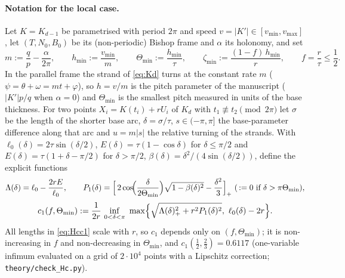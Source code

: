 
\paragraph{Notation for the local case.} Let $K=K_{d-1}$ be parametrised with period $2\pi$ and speed
$v=|K'|\in[v_{\min},v_{\max}]$, let $(T,N_0,B_0)$ be its (non-periodic) Bishop frame and $\alpha$ its holonomy,
and set
\[
m:=\frac qp-\frac{\alpha}{2\pi},\qquad h_{\min}:=\frac{v_{\min}}{m},\qquad
\Theta_{\min}:=\frac{h_{\min}}{\tau},\qquad \zeta_{\min}:=\frac{(1-f)\,h_{\min}}{r},\qquad f=\frac r\tau\le\frac12 .
\]
In the parallel frame the strand of \eqref{eq:Kd} turns at the constant rate $m$ ($\psi=\theta+\omega=mt+\varphi$),
so $h=v/m$ is the pitch parameter of the manuscript ($|K'|p/q$ when $\alpha=0$) and $\Theta_{\min}$ is the
smallest pitch measured in units of the base thickness. For two points $X_i=K(t_i)+rU_i$ of $K_d$ with
$t_1\not\equiv t_2 \pmod{2\pi}$ let $\sigma$ be the length of the shorter base arc, $\delta=\sigma/\tau$,
$s\in(-\pi,\pi]$ the base-parameter difference along that arc and $u=m|s|$ the relative turning of the strands.
With $\ell_0(\delta)=2\tau\sin(\delta/2)$, $E(\delta)=\tau(1-\cos\delta)$ for $\delta\le\pi/2$ and
$E(\delta)=\tau(1+\delta-\pi/2)$ for $\delta>\pi/2$, $\beta(\delta)=\delta^2/(4\sin(\delta/2))$, define the
explicit functions
\begin{equation}\label{eq:HcLP}
\Lambda(\delta)=\ell_0-\frac{2rE}{\ell_0},\qquad
P_1(\delta)=\Bigl[\,2\cos\!\Bigl(\frac{\delta}{2\Theta_{\min}}\Bigr)\sqrt{1-\beta(\delta)^2}-\frac{\delta^2}{3}\Bigr]_+
\ (\,:=0\text{ if }\delta>\pi\Theta_{\min}),
\end{equation}
\begin{equation}\label{eq:Hcc1}
c_1(f,\Theta_{\min}):=\frac1{2r}\,\inf_{0<\delta<\pi}\ \max\Bigl\{\sqrt{\Lambda(\delta)_+^2+r^2P_1(\delta)^2},\ \ell_0(\delta)-2r\Bigr\}.
\end{equation}
All lengths in \eqref{eq:Hcc1} scale with $r$, so $c_1$ depends only on $(f,\Theta_{\min})$; it is non-increasing in
$f$ and non-decreasing in $\Theta_{\min}$, and $c_1(\tfrac12,\tfrac23)=0.6117$ (one-variable infimum evaluated on a
grid of $2\cdot10^4$ points with a Lipschitz correction; \texttt{theory/check\_Hc.py}).

